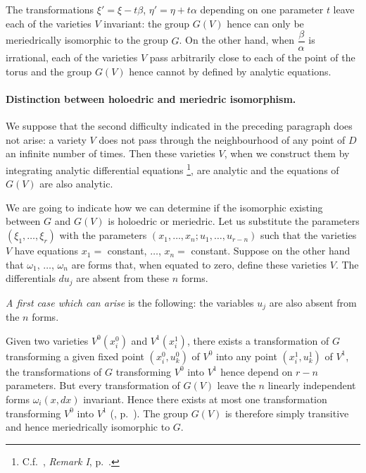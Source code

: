 The transformations $\xi'=\xi-t\beta$, $\eta'=\eta+t\alpha$ depending on one parameter $t$ leave each of the varieties $V$ invariant: the group $G(V)$ hence can only be meriedrically isomorphic to the group $G$. On the other hand, when $\dfrac{\beta}{\alpha}$ is irrational, each of the varieties $V$ pass arbitrarily close to each of the point of the torus and the group $G(V)$ hence cannot by defined by analytic equations. 

\paragraph{Distinction between holoedric and meriedric isomorphism.}
\label{sec:118}
We suppose that the second difficulty indicated in the preceding paragraph does not arise: a variety $V$ does not pass through the neighbourhood of any point of $D$ an infinite number of times. Then these varieties $V$, when we construct them by integrating analytic differential equations \footnote{C.f.~, \emph{Remark I}, p.~\pageref{sec:84}.}, are analytic and the equations of $G(V)$ are also analytic.

We are going to indicate how we can determine if the isomorphic existing between $G$ and $G(V)$ is holoedric or meriedric. Let us substitute the parameters $(\xi_{1},\dots,\xi_{r})$ with the parameters $(x_{1},\dots,x_{n};u_{1},\dots,u_{r-n})$ such that the varieties $V$ have equations $x_{1}=$ constant, $\dots$, $x_{n}=$ constant. Suppose on the other hand that $\omega_{1}$, $\dots$, $\omega_{n}$ are forms that, when equated to zero, define these varieties $V$. The differentials $du_{j}$ are absent from these $n$ forms.

\somespace

\emph{A first case which can arise} is the following: the variables $u_{j}$ are also absent from the $n$ forms.

Given two varieties $V^{0}(x^{0}_{i})$ and $V^{1}(x^{1}_{i})$, there exists a transformation of $G$ transforming a given fixed point $(x^{0}_{i},u^{0}_{k})$ of $V^{0}$ into any point $(x^{1}_{i},u^{1}_{k})$ of $V^{1}$, the transformations of $G$ transforming $V^{0}$ into $V^{1}$ hence depend on $r-n$ parameters. But every transformation of $G(V)$ leave the $n$ linearly independent forms $\omega_{i}(x,dx)$ invariant. Hence there exists at most one transformation transforming $V^{0}$ into $V^{1}$ (, p.~\pageref{sec:83}). The group $G(V)$ is therefore simply transitive and hence meriedrically isomorphic to $G$.

